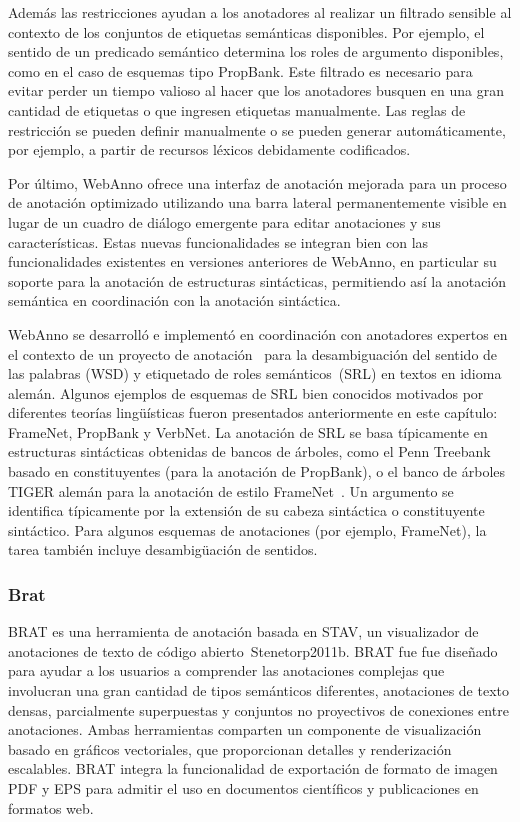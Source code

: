 Además las restricciones ayudan a los anotadores al realizar un filtrado sensible al contexto de los conjuntos de etiquetas semánticas disponibles.
Por ejemplo, el sentido de un predicado semántico determina los roles de argumento disponibles, como en el caso de esquemas tipo PropBank.
Este filtrado es necesario para evitar perder un tiempo valioso al hacer que los anotadores busquen en una gran cantidad de etiquetas o que ingresen etiquetas manualmente.
Las reglas de restricción se pueden definir manualmente o se pueden generar automáticamente, por ejemplo, a partir de recursos léxicos debidamente codificados.

Por último, WebAnno ofrece una interfaz de anotación mejorada para un proceso de anotación optimizado utilizando una barra lateral permanentemente visible en lugar de un cuadro de diálogo emergente para editar anotaciones y sus características.
Estas nuevas funcionalidades se integran bien con las funcionalidades existentes en versiones anteriores de WebAnno, en particular su soporte para la anotación de estructuras sintácticas, permitiendo así la anotación semántica en coordinación con la anotación sintáctica.

WebAnno se desarrolló e implementó en coordinación con anotadores expertos en el contexto de un proyecto de anotación~\cite{Mujdricza-Maydt2016} para la desambiguación del sentido de las palabras (WSD) y etiquetado de roles semánticos~(SRL) en textos en idioma alemán.
Algunos ejemplos de esquemas de SRL bien conocidos motivados por diferentes teorías lingüísticas fueron presentados anteriormente en este capítulo: FrameNet, PropBank y VerbNet.
La anotación de SRL se basa típicamente en estructuras sintácticas obtenidas de bancos de árboles, como el Penn Treebank basado en constituyentes (para la anotación de PropBank), o el banco de árboles TIGER alemán para la anotación de estilo FrameNet~\cite{Burchardt2009}.
Un argumento se identifica típicamente por la extensión de su cabeza sintáctica o constituyente sintáctico.
Para algunos esquemas de anotaciones (por ejemplo, FrameNet), la tarea también incluye desambigüación de sentidos.

\subsubsection*{Brat}

BRAT es una herramienta de anotación basada en STAV, un visualizador de anotaciones de texto de código abierto~{Stenetorp2011b}.
BRAT fue fue diseñado para ayudar a los usuarios a comprender las anotaciones complejas que involucran una gran cantidad de tipos semánticos diferentes, anotaciones de texto densas, parcialmente superpuestas y conjuntos no proyectivos de conexiones entre anotaciones.
Ambas herramientas comparten un componente de visualización basado en gráficos vectoriales, que proporcionan detalles y renderización escalables.
BRAT integra la funcionalidad de exportación de formato de imagen PDF y EPS para admitir el uso en documentos científicos y publicaciones en formatos web.

